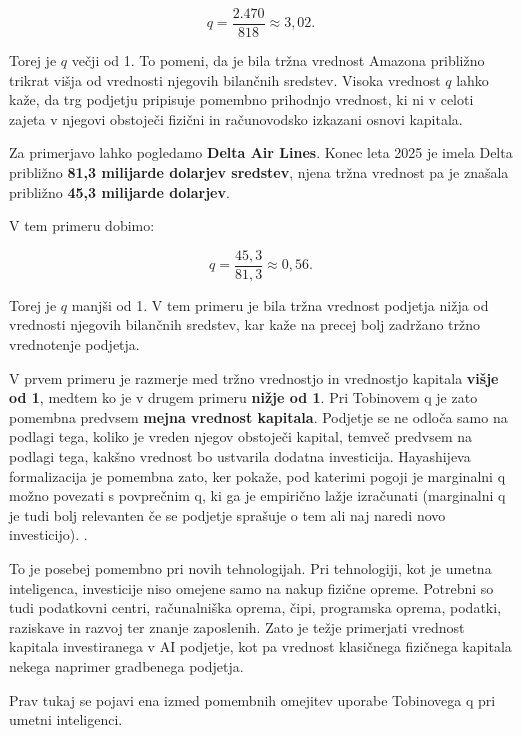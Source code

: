 \documentclass[12pt,a4paper]{article}
\begin{document}
\[
q = \frac{2.470}{818} \approx 3,02.
\]

Torej je $q$ večji od 1. To pomeni, da je bila tržna vrednost Amazona približno trikrat višja od vrednosti njegovih bilančnih sredstev. Visoka vrednost $q$ lahko kaže, da trg podjetju pripisuje pomembno prihodnjo vrednost, ki ni v celoti zajeta v njegovi obstoječi fizični in računovodsko izkazani osnovi kapitala.

Za primerjavo lahko pogledamo \textbf{Delta Air Lines}. Konec leta 2025 je imela Delta približno \textbf{81,3 milijarde dolarjev sredstev}, njena tržna vrednost pa je znašala približno \textbf{45,3 milijarde dolarjev}.

V tem primeru dobimo:

\[
q = \frac{45,3}{81,3} \approx 0,56.
\]

Torej je $q$ manjši od 1. V tem primeru je bila tržna vrednost podjetja nižja od vrednosti njegovih bilančnih sredstev, kar kaže na precej bolj zadržano tržno vrednotenje podjetja.

V prvem primeru je razmerje med tržno vrednostjo in vrednostjo kapitala \textbf{višje od 1}, medtem ko je v drugem primeru \textbf{nižje od 1}.
Pri Tobinovem q je zato pomembna predvsem \textbf{mejna vrednost kapitala}. Podjetje se ne odloča samo na podlagi tega,
koliko je vreden njegov obstoječi kapital, temveč predvsem na podlagi tega, kakšno vrednost bo ustvarila dodatna investicija.
Hayashijeva formalizacija je pomembna zato, ker pokaže, pod katerimi pogoji je  marginalni q možno povezati s povprečnim q,
ki ga je  empirično lažje izračunati (marginalni q je tudi bolj relevanten če se podjetje sprašuje o tem ali naj naredi novo investicijo).
\citep{AndreiMannMoyen2017}.

To je posebej pomembno pri novih tehnologijah. Pri tehnologiji, kot je umetna inteligenca, investicije niso
omejene samo na nakup fizične opreme. Potrebni so tudi podatkovni centri, računalniška oprema, čipi, programska oprema,
podatki, raziskave in razvoj ter znanje zaposlenih. Zato je težje primerjati vrednost kapitala investiranega v AI podjetje, 
kot pa vrednost klasičnega fizičnega kapitala nekega naprimer gradbenega podjetja.

Prav tukaj se pojavi ena izmed pomembnih omejitev uporabe Tobinovega q pri umetni inteligenci.
\end{document}
